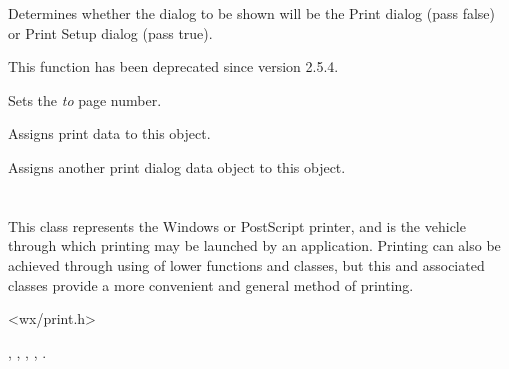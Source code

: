 \label{wxprintdialogdatasetsetupdialog}


Determines whether the dialog to be shown will be the Print dialog
(pass false) or Print Setup dialog (pass true).

This function has been deprecated since version 2.5.4.

\label{wxprintdialogdatasettopage}


Sets the {\it to} page number.


\label{wxprintdialogdataassign}


Assigns print data to this object.


Assigns another print dialog data object to this object.

\section{}\label{wxprinter}

This class represents the Windows or PostScript printer, and is the vehicle through
which printing may be launched by an application. Printing can also
be achieved through using of lower functions and classes, but
this and associated classes provide a more convenient and general
method of printing.




<wx/print.h>


, , ,\rtfsp
{}, .



\label{wxprinterctor}

